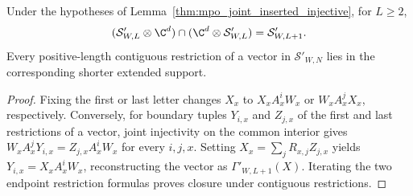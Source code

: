 \begin{lemma}
    \label{thm:mpo_joint_inserted_intersection}
    \leanok
    Under the hypotheses of Lemma~\ref{thm:mpo_joint_inserted_injective},
    for $L\geq2$,
    \begin{align}
        (\mathcal S'_{W,L}\otimes\C^d)
        \cap(\C^d\otimes\mathcal S'_{W,L})
        =\mathcal S'_{W,L+1}.
    \end{align}
    Every positive-length contiguous restriction of a vector in
    $\mathcal S'_{W,N}$ lies in the corresponding shorter extended support.
\end{lemma}
\begin{proof}
    \leanok
    Fixing the first or last letter changes $X_x$ to $X_xA_x^iW_x$ or
    $W_xA_x^jX_x$, respectively. Conversely, for boundary tuples
    $Y_{i,x}$ and $Z_{j,x}$ of the first and last restrictions of a
    vector, joint injectivity on the common interior gives
    $W_xA_x^jY_{i,x}=Z_{j,x}A_x^iW_x$ for every $i,j,x$.
    Setting $X_x=\sum_jR_{x,j}Z_{j,x}$ yields
    $Y_{i,x}=X_xA_x^iW_x$, reconstructing the vector as
    $\Gamma'_{W,L+1}(X)$. Iterating the two endpoint restriction formulas
    proves closure under contiguous restrictions.
\end{proof}

